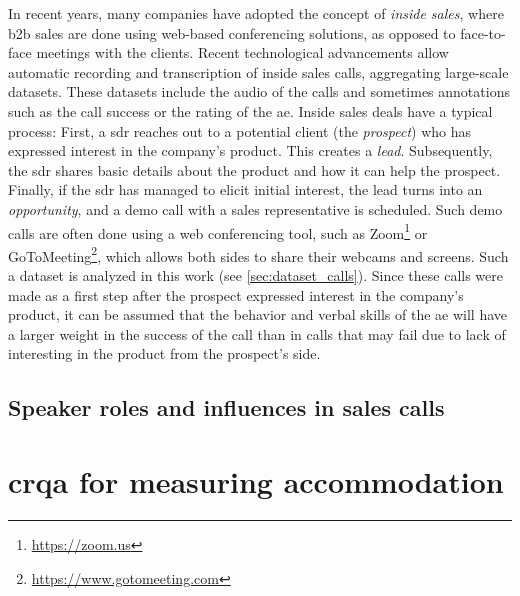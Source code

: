 In recent years, many companies have adopted the concept of \emph{inside sales}, where \ac{b2b} sales are done using web-based conferencing solutions, as opposed to face-to-face meetings with the clients.
Recent technological advancements allow automatic recording and transcription of inside sales calls, aggregating large-scale datasets.
These datasets include the audio of the calls and sometimes annotations such as the call success or the rating of the \ac{ae}.
Inside sales deals have a typical process:
First, a \ac{sdr} reaches out to a potential client (the \emph{prospect}) who has expressed interest in the company's product.
This creates a \emph{lead}.
Subsequently, the \ac{sdr} shares basic details about the product and how it can help the prospect.
Finally, if the \ac{sdr} has managed to elicit initial interest, the lead turns into an \emph{opportunity}, and a demo call with a sales representative is scheduled.
Such demo calls are often done using a web conferencing tool, such as Zoom\footnote{\url{https://zoom.us}} or GoToMeeting\footnote{\url{https://www.gotomeeting.com}}, which allows both sides to share their webcams and screens.
Such a dataset is analyzed in this work (see \cref{sec:dataset_calls}).
Since these calls were made as a first step after the prospect expressed interest in the company's product, it can be assumed that the behavior and verbal skills of the \ac{ae} will have a larger weight in the success of the call than in calls that may fail due to lack of interesting in the product from the prospect's side.


\subsection{Speaker roles and influences in sales calls}
\label{subsec:speaker_roles_and_influences_in_sales_calls}


\citet{Glaser2016conversational}
\citet{SilberVarod2018human}

\section[\Acl{crqa}]{\Acl{crqa} for measuring accommodation}
\label{sec:crqa}

